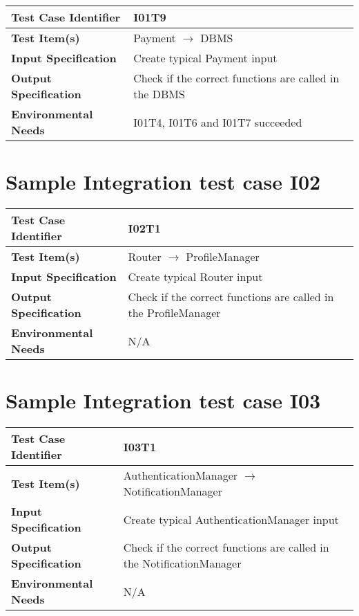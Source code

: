 \begin{center}
	\vspace{0.6cm}
	\begin{tabular}{|l|l|}
		\hline
		\textbf{Test Case Identifier} & I01T9 \bigstrut \\\hline
		\textbf{Test Item(s)} & Payment \ensuremath{\rightarrow} DBMS \bigstrut \\\hline
		\textbf{Input Specification} & Create typical Payment input \bigstrut \\\hline
		\textbf{Output Specification} & Check if the correct functions are called in the DBMS \bigstrut \\\hline
		\textbf{Environmental Needs} & I01T4, I01T6 and I01T7 succeeded \bigstrut \\\hline
	\end{tabular}
\end{center}


\section{Sample Integration test case I02}\label{I02}
\begin{center}
	\vspace{0.6cm}
	\begin{tabular}{|l|l|}
		\hline
		\textbf{Test Case Identifier} & I02T1 \bigstrut \\\hline
		\textbf{Test Item(s)} & Router \ensuremath{\rightarrow} ProfileManager \bigstrut \\\hline
		\textbf{Input Specification} & Create typical Router input \bigstrut \\\hline
		\textbf{Output Specification} & Check if the correct functions are called in the ProfileManager \bigstrut \\\hline
		\textbf{Environmental Needs} & N/A \bigstrut \\\hline
	\end{tabular}
\end{center}

\section{Sample Integration test case I03}\label{I03}
\begin{center}
	\vspace{0.6cm}
	\begin{tabular}{|l|l|}
		\hline
		\textbf{Test Case Identifier} & I03T1 \bigstrut \\\hline
		\textbf{Test Item(s)} & AuthenticationManager \ensuremath{\rightarrow} NotificationManager \bigstrut \\\hline
		\textbf{Input Specification} & Create typical AuthenticationManager input \bigstrut \\\hline
		\textbf{Output Specification} & Check if the correct functions are called in the NotificationManager \bigstrut \\\hline
		\textbf{Environmental Needs} & N/A \bigstrut \\\hline
	\end{tabular}
\end{center}

